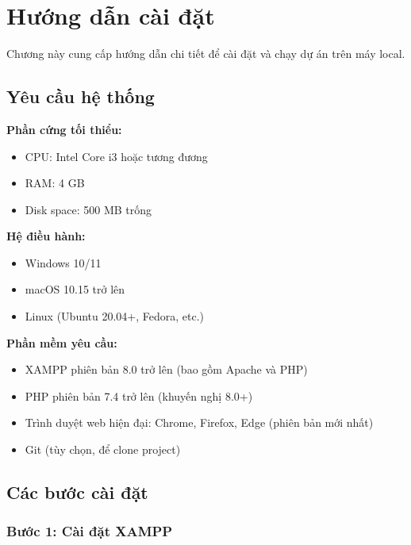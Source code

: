 
\section{Hướng dẫn cài đặt}

Chương này cung cấp hướng dẫn chi tiết để cài đặt và chạy dự án trên máy local.

\subsection{Yêu cầu hệ thống}

\textbf{Phần cứng tối thiểu:}
\begin{itemize}
    \item CPU: Intel Core i3 hoặc tương đương
    \item RAM: 4 GB
    \item Disk space: 500 MB trống
\end{itemize}

\textbf{Hệ điều hành:}
\begin{itemize}
    \item Windows 10/11
    \item macOS 10.15 trở lên
    \item Linux (Ubuntu 20.04+, Fedora, etc.)
\end{itemize}

\textbf{Phần mềm yêu cầu:}
\begin{itemize}
    \item XAMPP phiên bản 8.0 trở lên (bao gồm Apache và PHP)
    \item PHP phiên bản 7.4 trở lên (khuyến nghị 8.0+)
    \item Trình duyệt web hiện đại: Chrome, Firefox, Edge (phiên bản mới nhất)
    \item Git (tùy chọn, để clone project)
\end{itemize}

\subsection{Các bước cài đặt}

\subsubsection{Bước 1: Cài đặt XAMPP}

